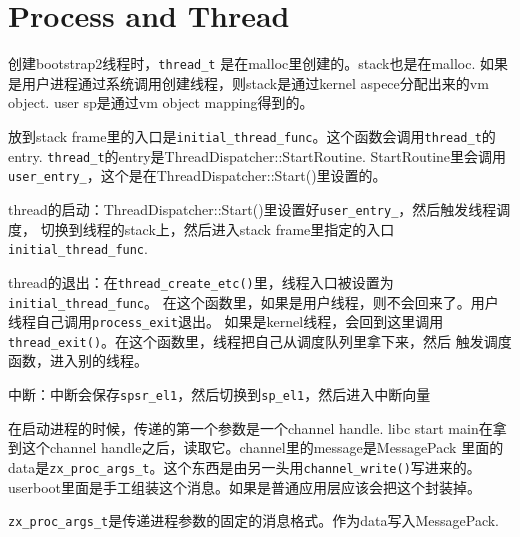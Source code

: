 \section{Process and Thread}

创建bootstrap2线程时，\verb|thread_t| 是在malloc里创建的。stack也是在malloc.
如果是用户进程通过系统调用创建线程，则stack是通过kernel aspece分配出来的vm object.
user sp是通过vm object mapping得到的。

放到stack frame里的入口是\verb|initial_thread_func|。这个函数会调用\verb|thread_t|的entry.
\verb|thread_t|的entry是ThreadDispatcher::StartRoutine. StartRoutine里会调用
\verb|user_entry_|，这个是在ThreadDispatcher::Start()里设置的。

thread的启动：ThreadDispatcher::Start()里设置好\verb|user_entry_|，然后触发线程调度，
切换到线程的stack上，然后进入stack frame里指定的入口\verb|initial_thread_func|.

thread的退出：在\verb|thread_create_etc()|里，线程入口被设置为\verb|initial_thread_func|。
在这个函数里，如果是用户线程，则不会回来了。用户线程自己调用\verb|process_exit|退出。
如果是kernel线程，会回到这里调用\verb|thread_exit()|。在这个函数里，线程把自己从调度队列里拿下来，然后
触发调度函数，进入别的线程。

中断：中断会保存\verb|spsr_el1|，然后切换到\verb|sp_el1|，然后进入中断向量


在启动进程的时候，传递的第一个参数是一个channel handle.
libc start main在拿到这个channel handle之后，读取它。channel里的message是MessagePack
里面的data是\verb|zx_proc_args_t|。这个东西是由另一头用\verb|channel_write()|写进来的。
userboot里面是手工组装这个消息。如果是普通应用层应该会把这个封装掉。

\verb|zx_proc_args_t|是传递进程参数的固定的消息格式。作为data写入MessagePack.